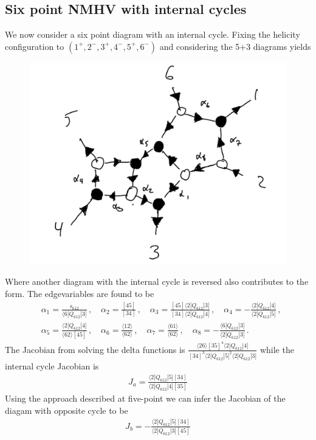 \documentclass[letter,11pt]{article}
\newcommand{\ab}[1]{\langle #1 \rangle}
\newcommand{\sqb}[1]{[ #1 ]}
\newcommand{\aMs}[3]{\langle #1|#2|#3]}  		%
\newcommand{\sab}[1]{s_{#1}}
\begin{document}
\subsection{Six point NMHV with internal cycles}
We now consider a six point diagram with an internal cycle. Fixing the helicity configuration to $(1^+,2^-,3^+,4^-,5^+,6^-)$ and considering the 5+3 diagrams yields 
\begin{figure}[H]
	\centering
	\includegraphics[width=0.5\linewidth]{3+5L}
	\caption{}
	\label{fig:5pt3l}
\end{figure}
Where another diagram with the internal cycle is reversed also contributes to the form. The edgevariables are found to be
\begin{equation}
	\begin{aligned}
		& \alpha_1 = \frac{\sab{612}}{\aMs{6}{Q_{612}}{3}}\,, \quad \alpha_2 = \frac{[45]}{[34]}\,, \quad \alpha_3 = \frac{[45]\aMs{2}{Q_{612}}{3}}{[34]\aMs{2}{Q_{612}}{4}}\,, \quad \alpha_4 = -\frac{\aMs{2}{Q_{612}}{4}}{\aMs{2}{Q_{612}}{5}}\,,\\ 
		&\alpha_5 = \frac{\aMs{2}{Q_{612}}{4}}{\ab{62}[45]}\,, 
		\quad
		\alpha_6 = \frac{\ab{12}}{\ab{62}}\,,\quad \alpha_7 = \frac{\ab{61}}{\ab{62}}\,,\quad
		\alpha_8 = - \frac{\aMs{6}{Q_{612}}{3}}{\aMs{2}{Q_{612}}{3}}\,.
	\end{aligned}
\end{equation}
The Jacobian from solving the delta functions is $ \frac{\ab{26}\sqb{35}^4\aMs{2}{Q_{612}}{4}}{\sqb{34}^3\aMs{2}{Q_{612}}{5}^2\aMs{2}{Q_{612}}{3}}$ while the internal cycle Jacobian is
\begin{equation}
	\begin{aligned}
		J_a=\frac{\aMs{2}{Q_{612}}{5}\sqb{34}}{\aMs{2}{Q_{612}}{4}\sqb{35}}
	\end{aligned}
\end{equation}
Using the approach described at five-point we can infer the Jacobian of the diagam with opposite cycle to be
\begin{equation}
	\begin{aligned}
		J_b=-\frac{\aMs{2}{Q_{612}}{5}\sqb{34}}{\aMs{2}{Q_{612}}{3}\sqb{45}}
	\end{aligned}
\end{equation}
\end{document}
